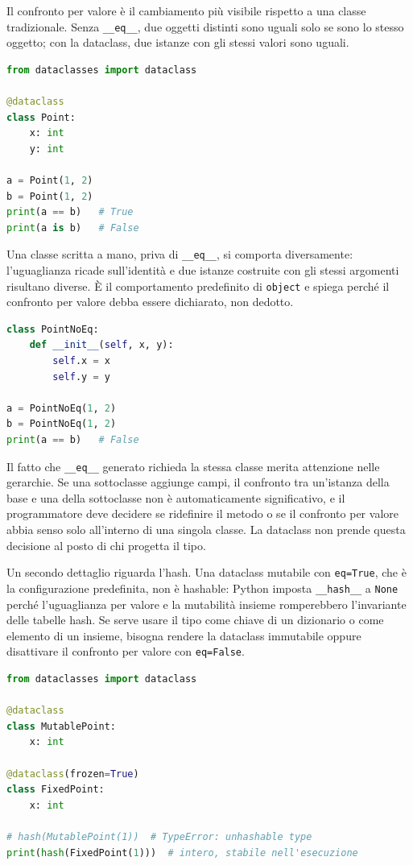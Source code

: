 \documentclass[12pt]{extarticle}
\begin{document}
\noindent Il confronto per valore è il cambiamento più visibile rispetto a una classe tradizionale. Senza \texttt{\_\_eq\_\_}, due oggetti distinti sono uguali solo se sono lo stesso oggetto; con la dataclass, due istanze con gli stessi valori sono uguali.

\begin{lstlisting}[language=Python]
from dataclasses import dataclass

@dataclass
class Point:
    x: int
    y: int

a = Point(1, 2)
b = Point(1, 2)
print(a == b)   # True
print(a is b)   # False
\end{lstlisting}

\noindent Una classe scritta a mano, priva di \texttt{\_\_eq\_\_}, si comporta diversamente: l'uguaglianza ricade sull'identità e due istanze costruite con gli stessi argomenti risultano diverse. È il comportamento predefinito di \texttt{object} e spiega perché il confronto per valore debba essere dichiarato, non dedotto.

\begin{lstlisting}[language=Python]
class PointNoEq:
    def __init__(self, x, y):
        self.x = x
        self.y = y

a = PointNoEq(1, 2)
b = PointNoEq(1, 2)
print(a == b)   # False
\end{lstlisting}

\noindent Il fatto che \texttt{\_\_eq\_\_} generato richieda la stessa classe merita attenzione nelle gerarchie. Se una sottoclasse aggiunge campi, il confronto tra un'istanza della base e una della sottoclasse non è automaticamente significativo, e il programmatore deve decidere se ridefinire il metodo o se il confronto per valore abbia senso solo all'interno di una singola classe. La dataclass non prende questa decisione al posto di chi progetta il tipo.

\noindent Un secondo dettaglio riguarda l'hash. Una dataclass mutabile con \texttt{eq=True}, che è la configurazione predefinita, non è hashable: Python imposta \texttt{\_\_hash\_\_} a \texttt{None} perché l'uguaglianza per valore e la mutabilità insieme romperebbero l'invariante delle tabelle hash. Se serve usare il tipo come chiave di un dizionario o come elemento di un insieme, bisogna rendere la dataclass immutabile oppure disattivare il confronto per valore con \texttt{eq=False}.

\begin{lstlisting}[language=Python]
from dataclasses import dataclass

@dataclass
class MutablePoint:
    x: int

@dataclass(frozen=True)
class FixedPoint:
    x: int

# hash(MutablePoint(1))  # TypeError: unhashable type
print(hash(FixedPoint(1)))  # intero, stabile nell'esecuzione
\end{lstlisting}
\end{document}
